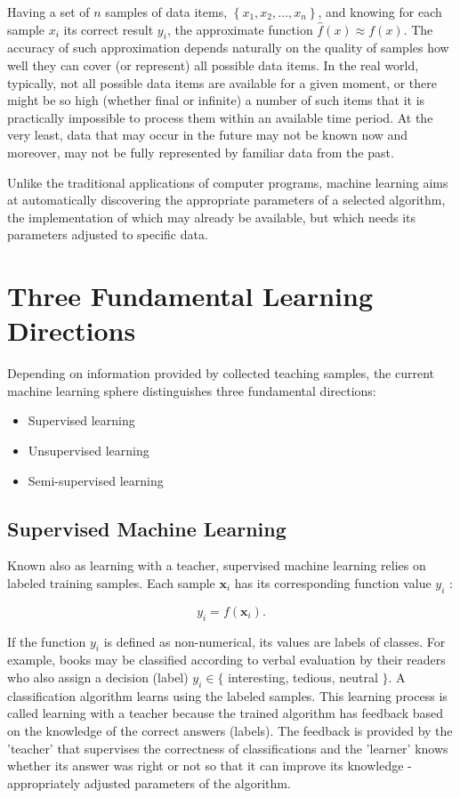\documentclass[11pt,openany,executivepaper]{book}
\begin{document}
Having a set of $n$ samples of data items, $\left\{x_{1}, x_{2}, \ldots, x_{n}\right\}$, and knowing for each sample $x_{i}$ its correct result $y_{i}$, the approximate function $\hat{f}(x) \approx f(x)$. The accuracy of such approximation depends naturally on the quality of samples how well they can cover (or represent) all possible data items. In the real world, typically, not all possible data items are available for a given moment, or there might be so high (whether final or infinite) a number of such items that it is practically impossible to process them within an available time period. At the very least, data that may occur in the future may not be known now and moreover, may not be fully represented by familiar data from the past.

Unlike the traditional applications of computer programs, machine learning aims at automatically discovering the appropriate parameters of a selected algorithm, the implementation of which may already be available, but which needs its parameters adjusted to specific data.

\section{Three Fundamental Learning Directions}
Depending on information provided by collected teaching samples, the current machine learning sphere distinguishes three fundamental directions:

\begin{itemize}
  \item Supervised learning
  \item Unsupervised learning
  \item Semi-supervised learning
\end{itemize}

\subsection{Supervised Machine Learning}
Known also as learning with a teacher, supervised machine learning relies on labeled training samples. Each sample $\mathbf{x}_{i}$ has its corresponding function value $y_{i}$ :

$$
y_{i}=f\left(\mathbf{x}_{i}\right) .
$$

If the function $y_{i}$ is defined as non-numerical, its values are labels of classes. For example, books may be classified according to verbal evaluation by their readers who also assign a decision (label) $y_{i} \in\{$ interesting, tedious, neutral $\}$. A classification algorithm learns using the labeled samples. This learning process is called learning with a teacher because the trained algorithm has feedback based on the knowledge of the correct answers (labels). The feedback is provided by the 'teacher' that supervises the correctness of classifications and the 'learner' knows whether its answer was right or not so that it can improve its knowledge - appropriately adjusted parameters of the algorithm.
\end{document}
